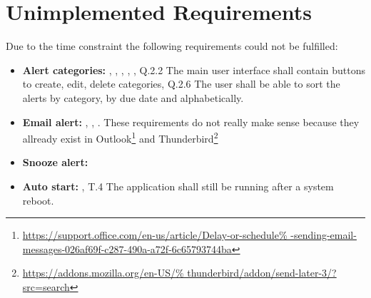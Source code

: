 \section{Unimplemented Requirements}

Due to the time constraint the following requirements could not be fulfilled:

\begin{itemize}

    \item \textbf{Alert categories:} ,
        ,
        ,
        ,
        ,
        Q.2.2 The main user interface shall contain buttons to create, edit,
        delete categories,
        Q.2.6 The user shall be able to sort the alerts by category, by due date
        and alphabetically.

    \item \textbf{Email alert:} ,
        ,
        . These requirements do not
        really make sense because they allready exist in Outlook\footnote{\url{
                https://support.office.com/en-us/article/Delay-or-schedule%
                -sending-email-messages-026af69f-c287-490a-a72f-6c65793744ba}}
                and Thunderbird\footnote{\url{https://addons.mozilla.org/en-US/%
                thunderbird/addon/send-later-3/?src=search}}

     \item \textbf{Snooze alert:} 

     \item \textbf{Auto start:} ,
         T.4 The application shall still be running after a system reboot.


\end{itemize}
